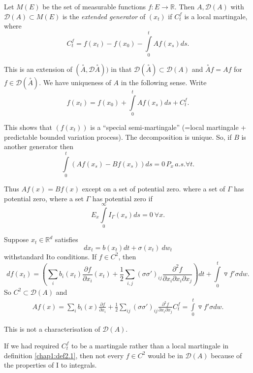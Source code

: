 \begin{definition}\label{chap1:def2.1} %
  Let $M(E)$ be the set of measurable functions $f : E \to
  \mathbb{R}$. Then $A, \mathcal{D}(A)$ with $\mathcal{D}(A) \subset
  M(E)$ is the {\em extended generator} of $(x_t)$ if $C^f_t$ is a
  local martingale, where  
  $$
  C_t^f = f(x_t) - f(x_0) - \int \limits ^t_0 A f(x_s) ds.
  $$
  
  This is an extension of $(\overset{\circ}{A},
  \mathcal{D}\overset{\circ}{A}))$ in that
  $\mathcal{D}(\overset{\circ}{A})\subset \mathcal{D}(A)$ and
  $\overset{\circ}{A} f = A f $ for $f \in
  \mathcal{D}(\overset{\circ}{A})$. We have uniqueness of $A$ in the
  following sense. Write  
  $$
  f(x_t) = f(x_0) + \int\limits_0^t A f (x_s) ds + C^f_t.
  $$
  
  This shows that $(f(x_t))$ is a ``special semi-martingale'' (=local
  martingale + predictable bounded variation process). The decomposition
  is unique. So, if $B$ is another generator then  
  $$
  \int\limits_0^t (A f(x_s)-Bf(x_s)) ds = 0\, P_x \,a.s. \forall t.
  $$
  
  Thus $A f(x) = B f (x)$ except on a set of potential zero. where a set
  of $\Gamma$ has potential zero, where a set $\Gamma$ has potential
  zero if  
  $$
  E_x \int\limits_0^\infty I_\Gamma (x_s) ds = 0 ~\forall x.
  $$
\end{definition}
	
\begin{example} %
  Suppose $x_t \in \mathbb{R}^d$ satisfies 
  $$
  dx_t = b(x_t) dt + \sigma (x_t)~ dw_t
  $$
  with\pageoriginale standard Ito conditions. If $f \in C^2$, then 
  $$
  df(x_t) = \left(\sum_i b_i (x_t) \frac{\partial f }{\partial x_i}(x_t) +
  \frac{1}{2} \sum_{i,j}(\sigma\sigma')_{ij}\frac{\partial^2
    f}{\partial x_i \partial x_i \partial x_j} \right) dt + \int\limits^t_0
  \triangledown f' \sigma dw.  
  $$
  So $C^2 \subset \mathcal{D}(A)$ and 
  \begin{align*}
    Af(x) = \sum_i b_i (x) \frac{\partial f }{\partial x_i} + \frac{1}{2}
    \sum_{ij} (\sigma\sigma')_{ij} \frac{\partial ^2 f}{\partial x_i
      \partial x_j }
    C^f_t  = \int\limits_0^t \triangledown f' \sigma dw. 
  \end{align*}
\end{example}

\medskip
{}
 This is not a characterisation of $\mathcal{D}(A)$. 

\begin{remark} %
  If we had required $C^f_t$ to be a martingale rather than a local
  martingale in definition \ref{chap1:def2.1}, then not every $f \in
  C^2$ would be  in $\mathcal{D}(A)$ because of the properties of I to
  integrals.   
\end{remark}


